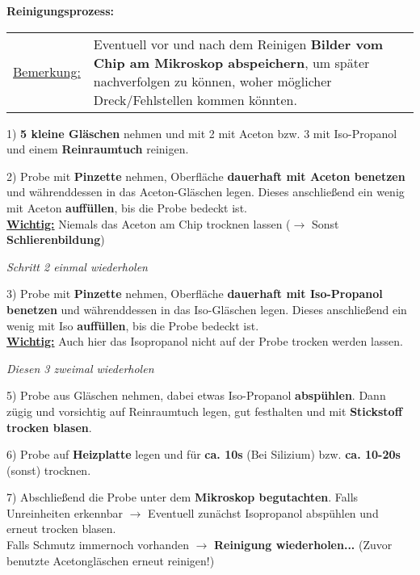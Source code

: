 \documentclass[12pt,a4paper]{article}
\begin{document}
\bigskip

\begin{center}
\textbf{Reinigungsprozess:}
\end{center}
\begin{tabular}{l p{14cm}}
\underline{Bemerkung:} & Eventuell vor und nach dem Reinigen \textbf{Bilder vom Chip am Mikroskop abspeichern}, um später nachverfolgen zu können, woher möglicher Dreck/Fehlstellen kommen könnten.
\end{tabular}


\begin{description}
\item 1) \textbf{5 kleine Gläschen} nehmen und mit 2 mit Aceton bzw. 3 mit Iso-Propanol und einem \textbf{Reinraumtuch} reinigen.

\item 2) Probe mit \textbf{Pinzette} nehmen, Oberfläche \textbf{dauerhaft mit Aceton benetzen} und währenddessen in das Aceton-Gläschen legen. Dieses anschließend ein wenig mit Aceton \textbf{auffüllen}, bis die Probe bedeckt ist.\\ 
\underline{\textbf{Wichtig:}} Niemals das Aceton am Chip trocknen lassen ($\rightarrow$ Sonst \textbf{Schlierenbildung})
\begin{center}
\textit{Schritt 2 einmal wiederholen}
\end{center}

\item 3) Probe mit \textbf{Pinzette} nehmen, Oberfläche \textbf{dauerhaft mit Iso-Propanol benetzen} und währenddessen in das Iso-Gläschen legen. Dieses anschließend ein wenig mit Iso \textbf{auffüllen}, bis die Probe bedeckt ist.\\ 
\underline{\textbf{Wichtig:}} Auch hier das Isopropanol nicht auf der Probe trocken werden lassen.
\begin{center}
\textit{Diesen 3 zweimal wiederholen}
\end{center}

\item 5) Probe aus Gläschen nehmen, dabei etwas Iso-Propanol \textbf {abspühlen}. Dann zügig und vorsichtig auf Reinraumtuch legen, gut festhalten und mit \textbf{Stickstoff trocken blasen}.\\

\item 6) Probe auf \textbf{Heizplatte} legen und für \textbf{ca. 10s} (Bei Silizium) bzw. \textbf{ca. 10-20s} (sonst) trocknen.\\

\item 7) Abschließend die Probe unter dem \textbf{Mikroskop begutachten}. Falls Unreinheiten erkennbar $\rightarrow$ Eventuell zunächst Isopropanol abspühlen und erneut trocken blasen.\\

Falls Schmutz immernoch vorhanden $\rightarrow$ \textbf{Reinigung wiederholen...} (Zuvor benutzte Acetongläschen erneut reinigen!)
\end{description}
\end{document}
